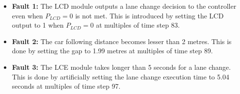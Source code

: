 \begin{itemize}
    \item \textbf{Fault 1:} The LCD module outputs a lane change decision to the controller even when $P_{LCD} = 0$ is not met. This is introduced by setting the LCD output to 1 when $P_{LCD} = 0$ at multiples of time step 83.
    \item \textbf{Fault 2:} The car following distance becomes lesser than 2 metres. This is done by setting the gap to 1.99 metres at multiples of time step 89.
    \item \textbf{Fault 3:} The LCE module takes longer than 5 seconds for a lane change. This is done by artificially setting the lane change execution time to 5.04 seconds at multiples of time step 97.
\end{itemize}





